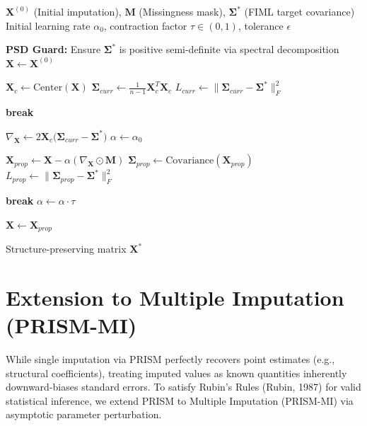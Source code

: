 \documentclass[11pt]{article}
\begin{document}
\begin{algorithm}[H]
\caption{The PRISM Algorithm: Masked Covariance Projection}
\label{alg:prism}
\begin{algorithmic}[1]
\Require $\bm{X}^{(0)}$ (Initial imputation), $\bm{M}$ (Missingness mask), $\bm{\Sigma}^*$ (FIML target covariance)
\Require Initial learning rate $\alpha_0$, contraction factor $\tau \in (0,1)$, tolerance $\epsilon$

\State \textbf{PSD Guard:} Ensure $\bm{\Sigma}^*$ is positive semi-definite via spectral decomposition
\State $\bm{X} \leftarrow \bm{X}^{(0)}$

    \State $\bm{X}_c \leftarrow \text{Center}(\bm{X})$
    \State $\bm{\Sigma}_{curr} \leftarrow \frac{1}{n-1} \bm{X}_c^T \bm{X}_c$
    \State $L_{curr} \leftarrow \big\| \bm{\Sigma}_{curr} - \bm{\Sigma}^* \big\|_F^2$
    
        \State \textbf{break} 
    \EndIf
    
    \State $\nabla_{\bm{X}} \leftarrow 2 \bm{X}_c \big(\bm{\Sigma}_{curr} - \bm{\Sigma}^*\big)$
    \State $\alpha \leftarrow \alpha_0$
    
     
        \State $\bm{X}_{prop} \leftarrow \bm{X} - \alpha (\nabla_{\bm{X}} \odot \bm{M})$ 
        \State $\bm{\Sigma}_{prop} \leftarrow \text{Covariance}(\bm{X}_{prop})$
        \State $L_{prop} \leftarrow \big\| \bm{\Sigma}_{prop} - \bm{\Sigma}^* \big\|_F^2$
        
            \State \textbf{break} 
        \EndIf
        \State $\alpha \leftarrow \alpha \cdot \tau$
    \EndWhile
    
    \State $\bm{X} \leftarrow \bm{X}_{prop}$
\EndWhile

\Ensure Structure-preserving matrix $\bm{X}^*$
\end{algorithmic}
\end{algorithm}

\section{Extension to Multiple Imputation (PRISM-MI)}
While single imputation via PRISM perfectly recovers point estimates (e.g., structural coefficients), treating imputed values as known quantities inherently downward-biases standard errors. To satisfy Rubin’s Rules (Rubin, 1987) for valid statistical inference, we extend PRISM to Multiple Imputation (PRISM-MI) via asymptotic parameter perturbation.
\end{document}
